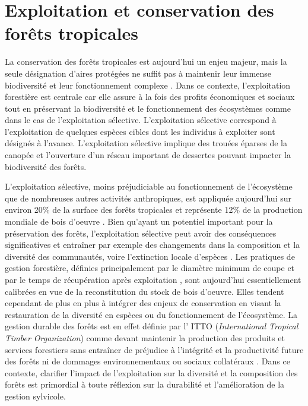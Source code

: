 \documentclass[
  11pt,
  french,
  A4paper,
  extrafontsizes,onecolumn,openright
  ]{memoir}
\begin{document}
\section{Exploitation et conservation des forêts
tropicales}\label{exploitation-et-conservation-des-forets-tropicales}

La conservation des forêts tropicales est aujourd'hui un enjeu majeur,
mais la seule désignation d'aires protégées ne suffit pas à maintenir
leur immense biodiversité et leur fonctionnement complexe
\autocite{Sist2015}. Dans ce contexte, l'exploitation forestière est
centrale car elle assure à la fois des profits économiques et sociaux
tout en préservant la biodiversité et le fonctionnement des écosystèmes
comme dans le cas de l'exploitation sélective. L'exploitation sélective
correspond à l'exploitation de quelques espèces cibles dont les
individus à exploiter sont désignés à l'avance. L'exploitation sélective
implique des trouées éparses de la canopée et l'ouverture d'un réseau
important de dessertes pouvant impacter la biodiversité des forêts.

L'exploitation sélective, moins préjudiciable au fonctionnement de
l'écosystème que de nombreuses autres activités anthropiques, est
appliquée aujourd'hui sur environ 20\% de la surface des forêts
tropicales et représente 12\% de la production mondiale de bois d'oeuvre
\autocite{Martin2015}. Bien qu'ayant un potentiel important pour la
préservation des forêts, l'exploitation sélective peut avoir des
conséquences significatives et entraîner par exemple des changements
dans la composition et la diversité des communautés, voire l'extinction
locale d'espèces \autocite{Gibson2011}. Les pratiques de gestion
forestière, définies principalement par le diamètre minimum de coupe et
par le temps de récupération après exploitation \autocite{Sist2015},
sont aujourd'hui essentiellement calibrées en vue de la reconstitution
du stock de bois d'oeuvre. Elles tendent cependant de plus en plus à
intégrer des enjeux de conservation en visant la restauration de la
diversité en espèces ou du fonctionnement de l'écosystème. La gestion
durable des forêts est en effet définie par l' ITTO (\emph{International
Tropical Timber Organization}) comme devant maintenir la production des
produits et services forestiers sans entraîner de préjudice à
l'intégrité et la productivité future des forêts ni de dommages
environnementaux ou sociaux collatéraux \autocite{ITTO2005}. Dans ce
contexte, clarifier l'impact de l'exploitation sur la diversité et la
composition des forêts est primordial à toute réflexion sur la
durabilité et l'amélioration de la gestion sylvicole.
\end{document}
